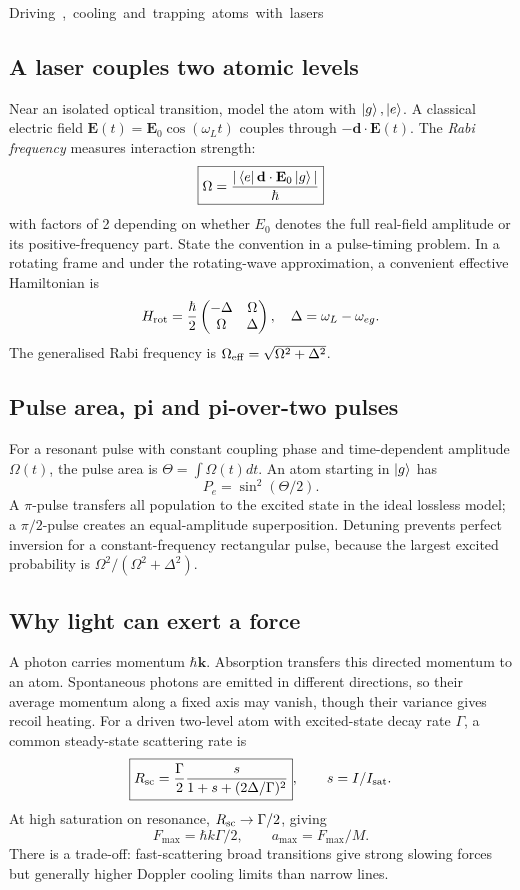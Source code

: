 \unit{Driving, cooling and trapping atoms with lasers}
\subsection{A laser couples two atomic levels}
Near an isolated optical transition,
model the atom with \(\left\lvert g\right\rangle,\left\lvert e\right\rangle\).
A classical electric field
\(\mathbf E(t)=\mathbf E_0\cos(\omega_Lt)\)
couples through \(-\mathbf d\cdot\mathbf E(t)\).
The \emph{Rabi frequency} measures
interaction strength:
\[
\boxed{\Omega=\frac{|\left\langle e\right\rvert\mathbf d\cdot
\mathbf E_0\left\lvert g\right\rangle|}{\hbar}}
\]
with factors of 2 depending on whether
\(E_0\) denotes the full real-field
amplitude or its positive-frequency
part. State the convention in a
pulse-timing problem.
In a rotating frame and under
the rotating-wave approximation,
a convenient effective Hamiltonian is
\[
H_{\rm rot}=\frac{\hbar}2
\begin{pmatrix}-\Delta&\Omega\\
\Omega&\Delta\end{pmatrix},
\quad
\Delta=\omega_L-\omega_{eg}.
\]
The generalised Rabi frequency is
\(\Omega_{\rm eff}=\sqrt{\Omega^2+\Delta^2}\).

\subsection{Pulse area, pi and pi-over-two pulses}
For a resonant pulse with constant
coupling phase and time-dependent
amplitude \(\Omega(t)\),
the pulse area is
\(\Theta=\int\Omega(t)dt\).
An atom starting in \(\left\lvert g\right\rangle\) has
\[
\boxed{P_e=\sin^2(\Theta/2).}
\]
A \(\pi\)-pulse transfers all population
to the excited state in the ideal
lossless model; a \(\pi/2\)-pulse
creates an equal-amplitude superposition.
Detuning prevents perfect inversion for
a constant-frequency rectangular pulse,
because the largest excited probability is
\(\Omega^2/(\Omega^2+\Delta^2)\).

\subsection{Why light can exert a force}
A photon carries momentum \(\hbar\mathbf k\).
Absorption transfers this directed momentum
to an atom. Spontaneous photons are emitted
in different directions, so their average
momentum along a fixed axis may vanish,
though their variance gives recoil heating.
For a driven two-level atom with excited-state
decay rate \(\Gamma\), a common steady-state
scattering rate is
\[
\boxed{R_{\rm sc}=\frac{\Gamma}{2}
\frac{s}{1+s+(2\Delta/\Gamma)^2}},
\qquad s=I/I_{\rm sat}.
\]
At high saturation on resonance,
\(R_{\rm sc}\to\Gamma/2\), giving
\[
\boxed{F_{\max}=\hbar k\Gamma/2,\qquad
a_{\max}=F_{\max}/M.}
\]
There is a trade-off: fast-scattering
broad transitions give strong slowing
forces but generally higher Doppler
cooling limits than narrow lines.


